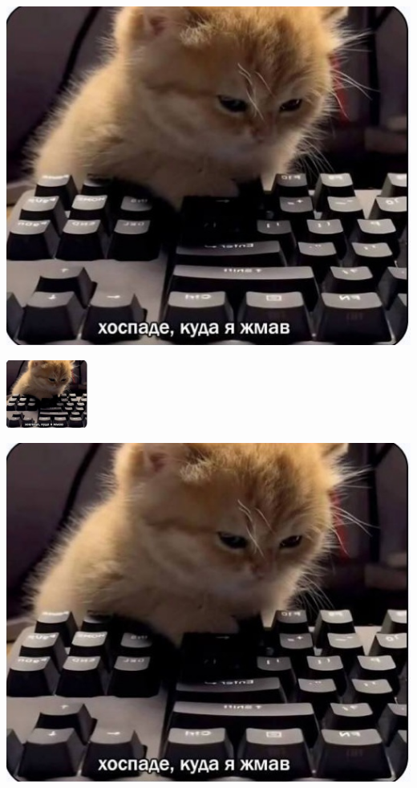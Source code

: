 \documentclass[twocolumn]{article}
\begin{document}
\begin{center}
\includegraphics[height=0.2\textheight]{same_mem} %
\end{center}

\begin{center}
\includegraphics[width=0.2\textwidth]{same_mem} %
\end{center}

\begin{center}
\includegraphics[width=0.2\linewidth]{same_mem} %
\end{center}
\end{document}
